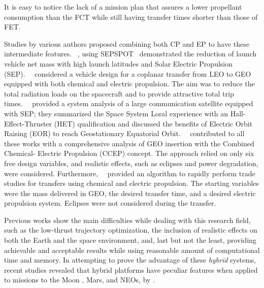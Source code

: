%
%
%
%
%
It is easy to notice the lack of a mission plan that assures a lower propellant consumption than the FCT while still having transfer times shorter than those of FET.

Studies by various authors proposed combining both CP and EP to have these intermediate features.
\citeauthor{oleson1996launch}~\cite{oleson1996launch}, using SEPSPOT~\cite{sackett1975solar} demonstrated the reduction of launch vehicle net mass with high launch latitudes and Solar Electric Propulsion (SEP).~\citeauthor{Mailhe:2002aa}~\cite{Mailhe:2002aa} considered a vehicle design for a coplanar transfer from LEO to GEO equipped with both chemical and electric propulsion. The aim was to reduce the total radiation loads on the spacecraft and to provide attractive total trip times.~\citeauthor{corey2010performance}~\cite{corey2010performance} provided a system analysis of a large communication satellite equipped with SEP; they summarized the Space System Loral experience with an Hall-Effect-Thruster (HET) qualification and discussed the benefits of Electric Orbit Raising (EOR) to reach Geostationary Equatorial Orbit.~\citeauthor{Kluever:2012aa}~\cite{Kluever:2012aa} contributed to all these works with a comprehensive analysis of GEO insertion with the Combined Chemical- Electric Propulsion (CCEP) concept. The approach relied on only six free design variables, and realistic effects, such as eclipses and power degradation, were considered.  Furthermore,~\citeauthor{Kluever:2015aa}~\cite{Kluever:2015aa} provided an algorithm to rapidly perform trade studies for transfers using chemical and electric propulsion. The starting variables were the mass delivered in GEO, the desired transfer time, and a desired electric propulsion system. Eclipses were not considered during the transfer.

Previous works show the main difficulties while dealing with this research field, such as the low-thrust trajectory optimization, the inclusion of realistic effects on both the Earth and the space environment, and, last but not the least, providing achievable and acceptable results while using reasonable amount of computational time and memory. In attempting to prove the advantage of these \textit{hybrid} systems, recent studies revealed that hybrid platforms have peculiar features when applied to missions to the Moon \cite{kluever1997optimal,mingotti2012hybrid}, Mars, and NEOs, by \cite{esa-prof}.

